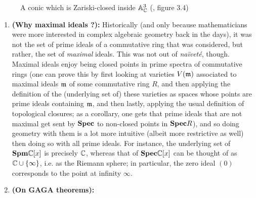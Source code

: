 \begin{example}
\begin{enumerate}
\begin{figure}[H]
                                \caption{A conic which is Zariski-closed inside $\mathbb{A}^3_{\mathbb{C}}$ (\cite{risingsea}, figure 3.4)}
                                \label{fig: conic}
                            \end{figure}
                    \end{enumerate}
                \end{example}
                
                \begin{remark}
                    \noindent
                    \begin{enumerate}
                        \item \textbf{(Why maximal ideals ?):} Historically (and only because mathematicians were more interested in complex algebraic geometry back in the days), it was not the set of prime ideals of a commutative ring that was considered, but rather, the set of \textit{maximal} ideals. This was not out of \textit{na\"ivet\'e}, though. Maximal ideals enjoy being closed points in prime spectra of commutative rings (one can prove this by first looking at varieties $V(\mathfrak{m})$ associated to maximal ideals $\mathfrak{m}$ of some commutative ring $R$, and then applying the definition of the (underlying set of) these varieties as spaces whose points are prime ideals containing $\mathfrak{m}$, and then lastly, applying the usual definition of topological closures; as a corollary, one gets that prime ideals that are not maximal get sent by $\mathbf{Spec}$ to non-closed points in $\mathbf{Spec} R$), and so doing geometry with them is a lot more intuitive (albeit more restrictive as well) then doing so with all prime ideals. For instance, the underlying set of $\mathbf{Spm} \mathbb{C}[x]$ is precisely $\mathbb{C}$, whereas that of $\mathbf{Spec} \mathbb{C}[x]$ can be thought of as $\mathbb{C} \cup \{\infty\}$, i.e. as the Riemann sphere; in particular, the zero ideal $(0)$ corresponds to the point at infinity $\infty$. 
                        \item \textbf{(On GAGA theorems):} 
                    \end{enumerate}
                \end{remark}
                
